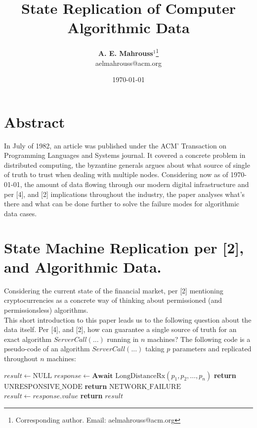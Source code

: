 \documentclass[10pt, twocolumn]{article}
\title{%
  \vspace{-1.5em}%
  \large\textbf{State Replication of Computer Algorithmic Data}%
}
\author{%
  \textbf{A. E. Mahrouss}$^{1}$\thanks{Corresponding author. Email: aelmahrouss@acm.org}
  \\aelmahrouss@acm.org\\[0.4em]
}
\date{%
  \small \today
}
\theoremstyle{plain}
\theoremstyle{definition}
\theoremstyle{remark}
\begin{document}

\twocolumn[{%
  \maketitle
  \vspace{-0.5em}
  \vspace{0.8em}
  \rule{\linewidth}{0.4pt}
  \vspace{1em}
}]


\section{Abstract}

In July of 1982, an article was published under the ACM' Transaction on Programming Languages and Systems journal. It covered a concrete problem in distributed computing, the byzantine generals argues about what source of single of truth to trust when dealing with multiple nodes. Considering now as of \today, the amount of data flowing through our modern digital infrastructure and per [4], and [2] implications throughout the industry, the paper analyses what's there and what can be done further to solve the failure modes for algorithmic data cases.

\section{State Machine Replication per [2], and Algorithmic Data.}

Considering the current state of the financial market, per [2] mentioning cryptocurrencies as a concrete way of thinking about permissioned (and permissionsless) algorithms.\\
This short introduction to this paper leads us to the following question about the data itself. Per [4], and [2], how can guarantee a single source of truth for an exact algorithm $ServerCall(...)$ running in $n$ machines? The following code is a pseudo-code of an algorithm $ServerCall(...)$ taking $p$ parameters and replicated throughout $n$ machines:

\begin{algorithm}
\caption{ServerCall(...)}
\begin{algorithmic}[1]
    \State $result \leftarrow \text{NULL}$
    \State $response \leftarrow \textbf{Await } \text{LongDistanceRx}(p_1, p_2, \dots, p_n)$
        \State \textbf{return} $\text{UNRESPONSIVE\_NODE}$
        \State \textbf{return} $\text{NETWORK\_FAILURE}$
    \Else
        \State $result \leftarrow response.value$
        \State \textbf{return} $result$
    \EndIf
\EndProcedure
\end{algorithmic}
\end{algorithm}
\end{document}
